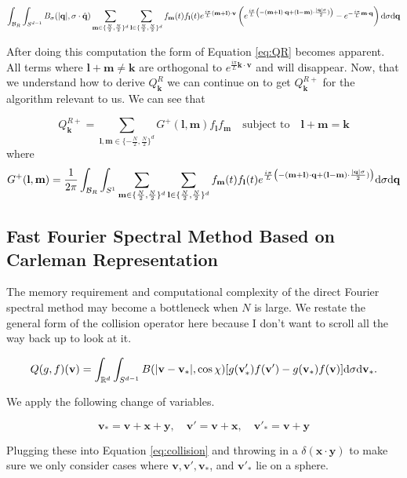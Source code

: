 \documentclass{article}
\def\b{\mathbf}
\def\t{\text}
\begin{document}
\begin{gather*}
    \int_{\mathcal{B}_R} \int_{S^{d-1}} B_{\sigma}(|\b q|, \sigma \cdot \hat{\b q}) \sum_{\b m \in \{\frac{N}{2}, \frac{N}{2} \}^d} \sum_{\b l \in \{\frac{N}{2}, \frac{N}{2} \}^d} f_{\b m}(t) f_{\b l}(t) e^{\frac{i \pi}{L} (\b m + \b l) \cdot \b v} \left( e^{\frac{i \pi}{L} \left( - (\b m + \b l) \cdot \b q + (\b l - \b m) \cdot \frac{|\b q| \sigma}{2} ) \right)}  - e^{- \frac{i \pi}{L} \b m \cdot \b q} \right) \t d \sigma \t d \b q \\ 
\end{gather*}

After doing this computation the form of Equation \ref{eq:QR} becomes apparent. All terms where $\b l + \b m \neq \b k$ are orthogonal to $e^{\frac{i \pi}{L} \b k \cdot \b v}$ and will disappear. Now, that we understand how to derive $Q^R_{\b k}$ we can continue on to get $Q^{R+}_{\b k}$ for the algorithm relevant to us. We can see that 

\[
Q^{R+}_{\b k} = \sum_{\b l,\b m \in \{-\frac{N}{2}, \frac{N}{2}\}^d} G^+(\b l,\b m) f_{\b l} f_{\b m} \quad \text{subject to} \quad \b l + \b m = \b k
\]
where 
\[
    G^+(\b l,\b m) = \frac{1}{2 \pi} \int_{\mathcal{B}_R} \int_{S^{1}} \sum_{\b m \in \{\frac{N}{2}, \frac{N}{2} \}^d} \sum_{\b l \in \{\frac{N}{2}, \frac{N}{2} \}^d} f_{\b m}(t) f_{\b l}(t) e^{\frac{i \pi}{L} \left( - (\b m + \b l) \cdot \b q + (\b l - \b m) \cdot \frac{|\b q| \sigma}{2} ) \right)}  \t d \sigma \t d \b q
\]

\subsection*{Fast Fourier Spectral Method Based on Carleman Representation}

The memory requirement and computational complexity of the direct Fourier spectral method may become a bottleneck when $N$ is large. We restate the general form of the collision operator here because I don't want to scroll all the way back up to look at it.

\[
    Q(g,f)(\b v) = \int_{\mathbb{R}^d} \int_{S^{d-1}} B(|\b v - \b v_*|,\cos \chi)[g(\b v_*') f(\b v') - g(\b v_*) f(\b v)] \t d \sigma \t d \b v_*.
\]

We apply the following change of variables.

\[
    \b v_* = \b v + \b x + \b y, \quad \b v' = \b v + \b x, \quad \b v'_* = \b v + \b y
\]

Plugging these into Equation \ref{eq:collision} and throwing in a $\delta(\b x \cdot \b y)$ to make sure we only consider cases where $\b v, \b v', \b v_*$, and $\b v'_*$ lie on a sphere.
\end{document}
